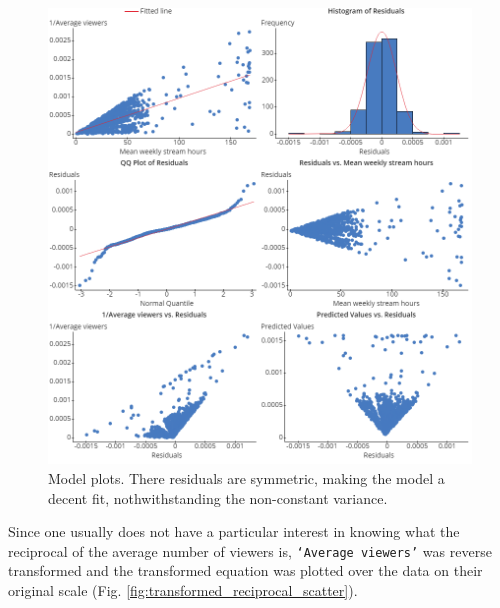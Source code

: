 \documentclass[12pt]{article}
\begin{document}
\begin{figure}[H]
  \centering %
  \includegraphics[scale=0.5]{../StatCrunch_Results/reciprocal/stream_time_reciprocal_avg_viewers_plots}
  \captionsetup{justification=centering, singlelinecheck=false, margin=2cm}
  \caption[Average Viewers Predicted by Stream Hours]{Model plots. There residuals are symmetric, making the model a decent fit, nothwithstanding the non-constant variance.}
  \label{fig:stream_time_reciprocal_avg_viewers}
\end{figure}

Since one usually does not have a particular interest in knowing what the reciprocal of the average number of viewers is, \texttt{`Average viewers'} was reverse transformed and the transformed equation was plotted over the data on their original scale (Fig. \ref{fig:transformed_reciprocal_scatter}).
\end{document}

